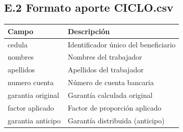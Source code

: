 \subsection{E.2 Formato aporte CICLO.csv}

\begin{center}
\begin{tabular}{lp{10cm}}
\toprule
Campo & Descripción \\
\midrule
cedula & Identificador único del beneficiario \\
nombres & Nombres del trabajador \\
apellidos & Apellidos del trabajador \\
numero cuenta & Número de cuenta bancaria \\
garantia original & Garantía calculada original \\
factor aplicado & Factor de proporción aplicado \\
garantia anticipo & Garantía distribuida (anticipo) \\
\bottomrule
\end{tabular}
\end{center}

\newpage

